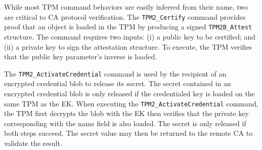 \documentclass[runningheads]{llncs}
\begin{document}

While most TPM command behaviors are easily inferred from their name,
two are critical to CA protocol verification.  The \verb|TPM2_Certify|
command provides proof that an object is loaded in the TPM by
producing a signed \verb|TPM2B_Attest| structure. The command requires
two inputs: (i) a public key to be certified; and (ii) a private key
to sign the attestation structure. To execute, the TPM
verifies that the public key parameter's inverse is loaded.



The \verb|TPM2_ActivateCredential| command is used by the recipient of
an encrypted credential blob to release its secret.  The secret
contained in an encrypted credential blob is only released if the
credentialed key is loaded on the same TPM as the EK.  When executing
the \verb|TPM2_ActivateCredential| command, the TPM first decrypts the
blob with the EK then verifies that the private key corresponding with
the name field is also loaded. The secret is only released if both
steps succeed. The secret value may then be returned to the remote CA
to validate the result.

\end{document}
